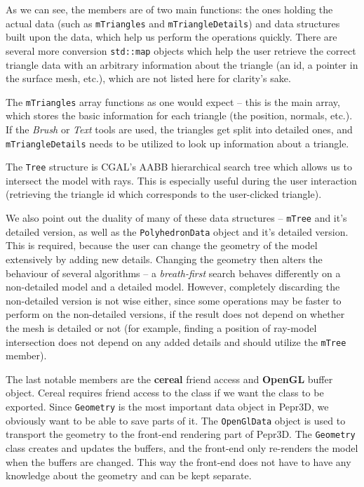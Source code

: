 As we can see, the members are of two main functions: the ones holding the actual data (such as \texttt{mTriangles} and \texttt{mTriangleDetails}) and data structures built upon the data, which help us perform the operations quickly. There are several more conversion \texttt{std::map} objects which help the user retrieve the correct triangle data with an arbitrary information about the triangle (an id, a pointer in the surface mesh, etc.), which are not listed here for clarity's sake.

The \texttt{mTriangles} array functions as one would expect -- this is the main array, which stores the basic information for each triangle (the position, normals, etc.). If the \textit{Brush} or \textit{Text} tools are used, the triangles get split into detailed ones, and \texttt{mTriangleDetails} needs to be utilized to look up information about a triangle.

The \texttt{Tree} structure is CGAL's AABB hierarchical search tree which allows us to intersect the model with rays. This is especially useful during the user interaction (retrieving the triangle id which corresponds to the user-clicked triangle).

We also point out the duality of many of these data structures -- \texttt{mTree} and it's detailed version, as well as the  \texttt{PolyhedronData} object and it's detailed version. This is required, because the user can change the geometry of the model extensively by adding new details. Changing the geometry then alters the behaviour of several algorithms -- a \textit{breath-first} search behaves differently on a non-detailed model and a detailed model. However, completely discarding the non-detailed version is not wise either, since some operations may be faster to perform on the non-detailed versions, if the result does not depend on whether the mesh is detailed or not (for example, finding a position of ray-model intersection does not depend on any added details and should utilize the \texttt{mTree} member).

The last notable members are the \textbf{cereal} friend access and \textbf{OpenGL} buffer object. Cereal requires friend access to the class if we want the class to be exported. Since \texttt{Geometry} is the most important data object in Pepr3D, we obviously want to be able to save parts of it. The \texttt{OpenGlData} object is used to transport the geometry to the front-end rendering part of Pepr3D. The \texttt{Geometry} class creates and updates the buffers, and the front-end only re-renders the model when the buffers are changed. This way the front-end does not have to have any knowledge about the geometry and can be kept separate.

